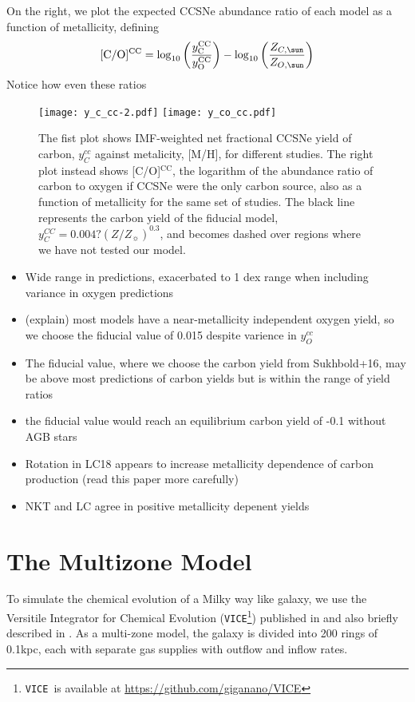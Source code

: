\documentclass[fleqn,usenatbib]{mnras}
\newcommand{\VICE}{\texttt{VICE}}
\begin{document}
On the right, we plot the expected CCSNe abundance ratio of each model as a function of metallicity, defining
\begin{equation}
    {\rm [C/O]^{CC}} = \log_{10}\left( \frac{y_{\rm C}^{\rm CC}}{y_{\rm O}^{\rm CC}}\right) - \log_{10} \left( \frac{Z_{C, \sun }}{Z_{O, \sun }} \right)
\end{equation}
Notice how even these ratios 
\begin{figure}
    \texttt{[image: y\_c\_cc-2.pdf]}
    \texttt{[image: y\_co\_cc.pdf]}
    \caption{The fist plot shows IMF-weighted net fractional CCSNe yield of carbon, $y_C^{cc}$ against metalicity, [M/H], for different studies. The right plot instead shows [C/O]$^\text{CC}$, the logarithm of the abundance ratio of carbon to oxygen if CCSNe were the only carbon source, also as a function of metallicity for the same set of studies. The black line represents the carbon yield of the fiducial model, $y_C^{CC} = 0.004? (Z/Z_{\sun})^{0.3}$, and becomes dashed over regions where we have not tested our model. }
    \label{fig:y_cc}
\end{figure}

    \begin{itemize}
        \item Wide range in predictions, exacerbated to 1 dex range when including variance in oxygen predictions
        \item (explain) most models have a near-metallicity independent oxygen yield, so we choose the fiducial value of 0.015 despite varience in $y_O^{cc}$
        \item The fiducial value, where we choose the carbon yield from Sukhbold+16, may be above most predictions of carbon yields but is within the range of yield ratios
        \item the fiducial value would reach an equilibrium carbon yield of -0.1 without AGB stars
        \item Rotation in LC18 appears to increase metallicity dependence of carbon production (read this paper more carefully)
        \item NKT and LC agree in positive metallicity depenent yields
    \end{itemize}
    

\section{The Multizone Model}

To simulate the chemical evolution of a Milky way like galaxy, we use the Versitile Integrator for
Chemical Evolution (\VICE\footnote{\VICE~is available at \url{https://github.com/giganano/VICE}}) published in \citet{james+21} and also briefly described in
\citet{james+22}. 
As a multi-zone model, the galaxy is divided into 200 rings of 0.1kpc, each with separate gas supplies with outflow and inflow rates.
\end{document}
